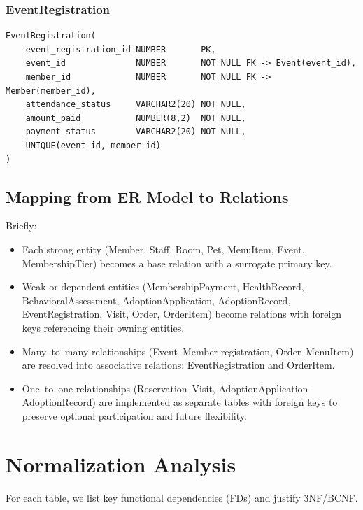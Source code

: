 \documentclass[11pt]{article}
\begin{document}
\subsubsection*{EventRegistration}
\begin{verbatim}
EventRegistration(
    event_registration_id NUMBER       PK,
    event_id              NUMBER       NOT NULL FK -> Event(event_id),
    member_id             NUMBER       NOT NULL FK -> Member(member_id),
    attendance_status     VARCHAR2(20) NOT NULL,
    amount_paid           NUMBER(8,2)  NOT NULL,
    payment_status        VARCHAR2(20) NOT NULL,
    UNIQUE(event_id, member_id)
)
\end{verbatim}

\subsection{Mapping from ER Model to Relations}

Briefly:

\begin{itemize}
    \item Each strong entity (Member, Staff, Room, Pet, MenuItem, Event, MembershipTier) becomes a base relation with a surrogate primary key.
    \item Weak or dependent entities (MembershipPayment, HealthRecord, BehavioralAssessment, AdoptionApplication, AdoptionRecord, EventRegistration, Visit, Order, OrderItem) become relations with foreign keys referencing their owning entities.
    \item Many--to--many relationships (Event--Member registration, Order--MenuItem) are resolved into associative relations: EventRegistration and OrderItem.
    \item One--to--one relationships (Reservation--Visit, AdoptionApplication--AdoptionRecord) are implemented as separate tables with foreign keys to preserve optional participation and future flexibility.
\end{itemize}

\newpage

\section{Normalization Analysis}

For each table, we list key functional dependencies (FDs) and justify 3NF/BCNF.
\end{document}
